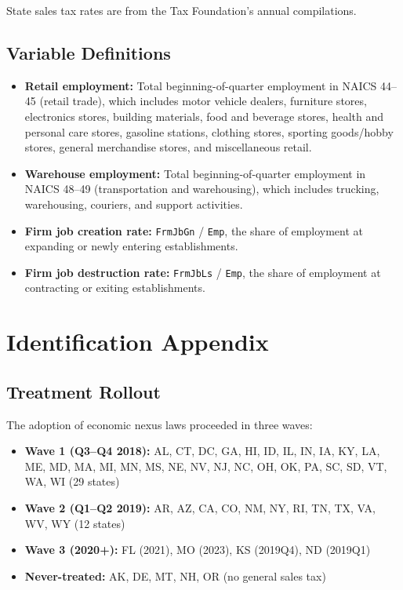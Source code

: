 \documentclass[12pt]{article}
\begin{document}
State sales tax rates are from the Tax Foundation's annual compilations.

\subsection{Variable Definitions}

\begin{itemize}
  \item \textbf{Retail employment:} Total beginning-of-quarter employment in NAICS 44--45 (retail trade), which includes motor vehicle dealers, furniture stores, electronics stores, building materials, food and beverage stores, health and personal care stores, gasoline stations, clothing stores, sporting goods/hobby stores, general merchandise stores, and miscellaneous retail.
  \item \textbf{Warehouse employment:} Total beginning-of-quarter employment in NAICS 48--49 (transportation and warehousing), which includes trucking, warehousing, couriers, and support activities.
  \item \textbf{Firm job creation rate:} \texttt{FrmJbGn} / \texttt{Emp}, the share of employment at expanding or newly entering establishments.
  \item \textbf{Firm job destruction rate:} \texttt{FrmJbLs} / \texttt{Emp}, the share of employment at contracting or exiting establishments.
\end{itemize}


\section{Identification Appendix}

\subsection{Treatment Rollout}

The adoption of economic nexus laws proceeded in three waves:
\begin{itemize}
  \item \textbf{Wave 1 (Q3--Q4 2018):} AL, CT, DC, GA, HI, ID, IL, IN, IA, KY, LA, ME, MD, MA, MI, MN, MS, NE, NV, NJ, NC, OH, OK, PA, SC, SD, VT, WA, WI (29 states)
  \item \textbf{Wave 2 (Q1--Q2 2019):} AR, AZ, CA, CO, NM, NY, RI, TN, TX, VA, WV, WY (12 states)
  \item \textbf{Wave 3 (2020+):} FL (2021), MO (2023), KS (2019Q4), ND (2019Q1)
  \item \textbf{Never-treated:} AK, DE, MT, NH, OR (no general sales tax)
\end{itemize}
\end{document}
